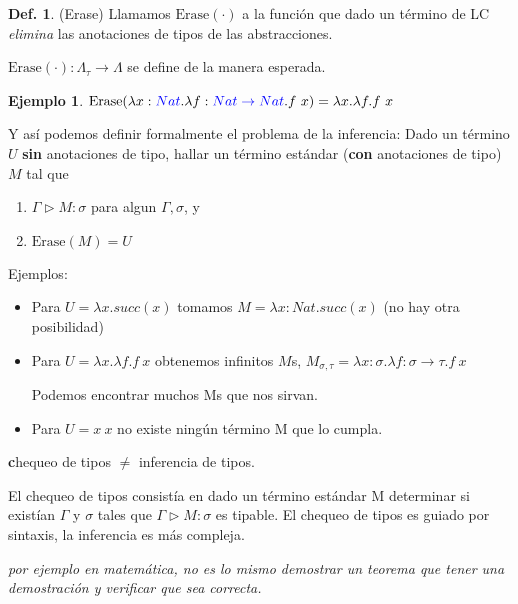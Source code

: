 \documentclass{report}
\theoremstyle{definition} %
\newtheorem{definition}{Def.}[chapter]
\newtheorem*{example*}{Ejemplo}
\newenvironment{nota}[1]
    {\begin{leftbar}\textbf{#1}}
    {\end{leftbar}}
\newcommand{\tfunc}[2]{#1 \to #2}
\newcommand{\abs}[3]{\lambda #1 : #2 . #3}
\newcommand{\app}[2]{#1 \ #2} %
\newcommand{\uabs}[2]{\lambda #1 . #2} %
\newcommand{\tipa}[3]{#1 \rhd #2 : #3} %
\newcommand{\Gtipa}[2]{\tipa{\Gamma}{#1}{#2}}
\newcommand{\suc}[1]{succ(#1)}
\newcommand{\select}[1]{\textcolor{blue}{#1}}
\newcommand{\untypedTerms}{\Lambda}
\newcommand{\typedTerms}{\Lambda_\tau}
\newcommand{\erase}[1]{\text{Erase}(#1)}
\begin{document}
\begin{definition}(Erase)
    Llamamos $\erase{\cdot}$ a la función que dado un término de LC
    \textit{elimina} las anotaciones de tipos de las abstracciones.

    $\erase{\cdot}: \tfunc{\typedTerms}{\untypedTerms}$ se define de la manera
    esperada.

    \begin{example*}
        \(\erase{\abs{x}{\select{Nat}}{\abs{f}{\select{\tfunc{Nat}{Nat}}}{\app{f}{x}}}}
        =
        \uabs{x}{\uabs{f}{\app{f}{x}}}
        \)
    \end{example*}
\end{definition}

Y así podemos definir formalmente el problema de la inferencia: Dado un término
$U$ \textbf{sin} anotaciones de tipo, hallar un término estándar (\textbf{con}
anotaciones de tipo) $M$ tal que

\begin{enumerate}
    \item $\Gtipa{M}{\sigma}$ para algun $\Gamma, \sigma$, y
    \item $\erase{M} = U$
\end{enumerate}

Ejemplos:

\begin{itemize}
    \item Para $U = \uabs{x}{\suc{x}}$ tomamos $M = \abs{x}{Nat}{\suc{x}}$ (no
    hay otra posibilidad)
    \item Para $U = \uabs{x}{\uabs{f}{\app{f}{x}}}$ obtenemos infinitos $M$s,
    $M_{\sigma, \tau} =
    \abs{x}{\sigma}{\abs{f}{\tfunc{\sigma}{\tau}}{\app{f}{x}}}$

    Podemos encontrar muchos Ms que nos sirvan.

    \item Para $U = \app{x}{x}$ no existe ningún término M que lo cumpla.
\end{itemize}

\begin{nota}
    chequeo de tipos $\neq$ inferencia de tipos.

    El chequeo de tipos consistía en dado un término estándar M determinar si
    existían $\Gamma$ y $\sigma$ tales que $\Gtipa{M}{\sigma}$ es tipable.
    El chequeo de tipos es guiado por sintaxis, la inferencia es más compleja.

    \textit{por ejemplo en matemática, no es lo mismo demostrar un teorema que tener una demostración y verificar que sea correcta.}

\end{nota}
\end{document}

